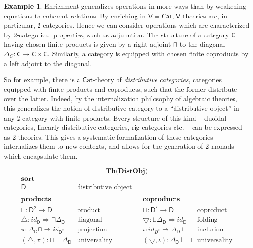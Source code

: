 \documentclass{amsart}
\theoremstyle{definition}
\newtheorem{example}[theorem]{Example}
\newcommand{\Cat}{\mathsf{Cat}}
\newcommand{\V}{\mathsf{V}}
\newcommand{\D}{\mathsf{D}}
\newcommand{\C}{\mathsf{C}}
\newcommand{\maps}{\colon}
\begin{document}
\begin{example}
  Enrichment generalizes operations in more ways than by weakening equations to coherent relations. By enriching in $\V = \Cat$, $\V$-theories are, in particular, 2-categories. Hence we can consider operations which are characterized by 2-categorical properties, such as adjunction. The structure of a category $\C$ having chosen finite products is given by a right adjoint $\sqcap$ to the diagonal $\Delta_C\maps \C \to \C\times \C$. Similarly, a category is equipped with chosen finite coproducts by a left adjoint to the diagonal.

  So for example, there is a $\Cat$-theory of \textit{distributive categories}, categories equipped with finite products and coproducts, such that the former distribute over the latter. Indeed, by the internalization philosophy of algebraic theories, this generalizes the notion of distributive category to a ``distributive object'' in any 2-category with finite products. Every structure of this kind -- duoidal categories, linearly distributive categories, rig categories etc. -- can be expressed as 2-theories. This gives a systematic formalization of these categories, internalizes them to new contexts, and allows for the generation of 2-monads which encapsulate them.\newpage

  \[ \textbf{Th(DistObj)} \]
  \[\begin{array}{lllll}
      \textbf{sort} \\
             \D & \text{distributive object}\\\\
            
      \textbf{products}  &&& \textbf{coproducts} \\
      \sqcap\maps \D^2 \to \D & \text{product} && \sqcup\maps \D^2 \to \D & \text{coproduct}\\
\bigtriangleup\maps id_\D \Longrightarrow \sqcap\Delta_\D & \text{diagonal} && \bigtriangledown\maps \sqcup\Delta_\D \Longrightarrow id_\D & \text{folding}\\
\pi\maps \Delta_\D\sqcap \Longrightarrow id_{\D^2} & \text{projection} && \iota\maps id_{D^2}\Longrightarrow \Delta_\D\sqcup & \text{inclusion}\\
(\bigtriangleup, \pi)\maps \sqcap \vdash \Delta_\D & \text{universality} && (\bigtriangledown,\iota)\maps \Delta_\D \vdash \sqcup & \text{universality}\\\\


\end{array}\]
\end{example}
\end{document}
